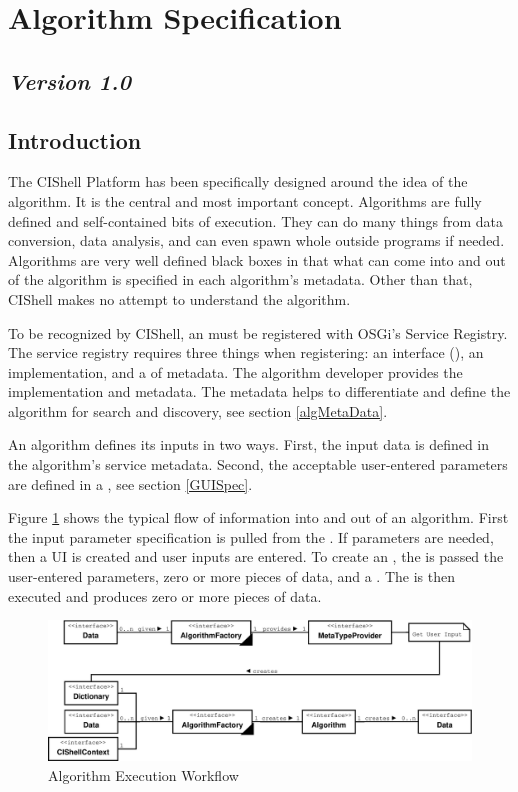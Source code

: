 \section{Algorithm Specification}

\subsection*{\textit{Version 1.0}}

\subsection{Introduction}

The CIShell Platform has been specifically designed around the idea of the
algorithm. It is the central and most important concept. Algorithms are fully
defined and self-contained bits of execution. They can do many things from data
conversion, data analysis, and can even spawn whole outside programs if needed.
Algorithms are very well defined black boxes in that what can come into and out
of the algorithm is specified in each algorithm's metadata. Other than that,
CIShell makes no attempt to understand the algorithm.

To be recognized by CIShell, an  must be registered with
OSGi's Service Registry. The service registry requires three things when
registering: an interface (), an implementation, and a
 of metadata. The algorithm developer provides the
implementation and metadata. The metadata helps to differentiate and define the
algorithm for search and discovery, see section \ref{algMetaData}.

An algorithm defines its inputs in two ways. First, the input data is defined in
the algorithm's service metadata. Second, the acceptable user-entered parameters
are defined in a , see section \ref{GUISpec}.

Figure \ref{fig:algExecWorkflow} shows the typical flow of information into and
out of an algorithm. First the input parameter specification is pulled from the
. If parameters are needed, then a UI is created and user
inputs are entered. To create an , the 
is passed the user-entered parameters, zero or more pieces of data, and a
. The  is then executed and produces zero
or more pieces of data.

\begin{figure}[htb!]
\centering
\includegraphics[width=150mm]{../img/algExecWorkflow.pdf}
\caption{Algorithm Execution Workflow}
\label{fig:algExecWorkflow}
\end{figure}

